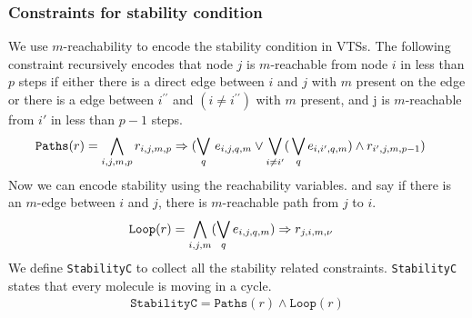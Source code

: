 \subsubsection{Constraints for stability condition}
%
We use $m$-reachability to encode the stability condition in VTSs.
%
The following constraint recursively encodes that node $j$ is $m$-reachable from node $i$ in less than $p$ steps
if either there is a direct edge between $i$ and $j$ with $m$ present on the edge or there is a edge between $i^{\prime \prime}$ and
$(i \neq i^{\prime \prime})$ with $m$ present, and j is $m$-reachable from $i'$ in less than $p-1$ steps.
%
\begin{align*}
  \texttt{Paths}(r) &= \bigwedge\limits_{i,j,m,p} r_{i,j,m,p} \Rightarrow (\bigvee_{q} \, e_{i,j,q,m} \lor \bigvee_{i\neq i^{\prime}} ( \, \bigvee_{q} e_{i,i^{\prime},q,m}) \land r_{i^{\prime},j,m,p-1} )
\end{align*}
Now we can encode stability using the reachability variables.
and say if there is an $m$-edge between $i$ and $j$, there is
$m$-reachable path from $j$ to $i$.
\begin{align*}
 \texttt{Loop}(r) &= \bigwedge\limits_{i,j,m} (\bigvee_{q} e_{i,j,q,m}) \Rightarrow r_{j,i,m,\nu}
\end{align*}
We define \texttt{StabilityC} to collect all the stability related constraints.
% 
\texttt{StabilityC} states that every molecule is moving in a cycle.
\begin{align*}
\texttt{StabilityC} = \texttt{Paths}(r) \land \texttt{Loop}(r) 
\end{align*}






